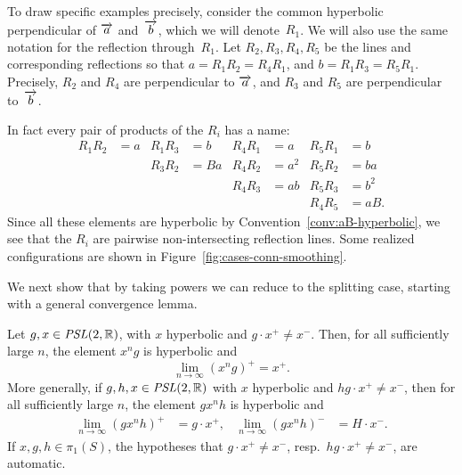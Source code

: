 To draw specific examples precisely, consider the common hyperbolic perpendicular of $\overrightarrow{a}$
and~$\overrightarrow{b}$, which we will denote~$R_1$. We will also use the
same notation for the reflection through~$R_1$.
Let $R_2, R_3, R_4, R_5$ be the lines and corresponding reflections so
that $a=R_1 R_2 = R_4 R_1$, and $b=R_1 R_3 = R_5 R_1$. Precisely,
$R_2$ and $R_4$ are perpendicular to $\overrightarrow{a}$, and $R_3$ and $R_5$
are perpendicular to~$\overrightarrow{b}$.

In fact every pair of products of the $R_i$ has a name:
\begin{align*}
  R_1 R_2 &= a  &  R_1 R_3 &= b  &  R_4 R_1 &= a  &  R_5 R_1 &= b\\
               &&  R_3 R_2 &= Ba &  R_4 R_2 &= a^2&  R_5 R_2 &= ba\\
                              &&&&  R_4 R_3 &= ab &  R_5 R_3 &= b^2\\
                                             &&&&&& R_4 R_5 &= aB.
\end{align*}
Since all
these elements are hyperbolic by Convention~\ref{conv:aB-hyperbolic},
we see
that the $R_i$ are pairwise non-intersecting reflection
lines. Some realized configurations are shown
in Figure~\ref{fig:cases-conn-smoothing}.

We next show that by taking powers we can reduce to the splitting
case, starting with a general convergence lemma.

\begin{lemma}
\label{lem:convergence_action}
Let $g,x \in \operatorname{\mathit{PSL}}(2,\mathbb{R})$, with $x$ hyperbolic and
$g \cdot x^+ \neq x^-$. Then, for all sufficiently large $n$,
the element $x^n g$ is hyperbolic and
\[
\lim_{n \to \infty} (x^n g)^+ = x^+ .
\]
More generally, if $g,h,x \in \operatorname{\mathit{PSL}}(2,\mathbb{R})$ with $x$ hyperbolic and
$hg \cdot x^+ \ne x^-$, then for all sufficiently large $n$, the
element $g x^n h$ is hyperbolic and
\begin{align*}
  \lim_{n \to \infty} (g x^n h)^+ &= g \cdot x^+, &
  \lim_{n \to \infty} (g x^n h)^- &= H \cdot x^-.
\end{align*}
If $x,g,h \in \pi_1(S)$, the hypotheses that $g \cdot x^+ \ne x^-$,
resp.\ $hg \cdot x^+ \ne x^-$, are automatic.
\end{lemma}

